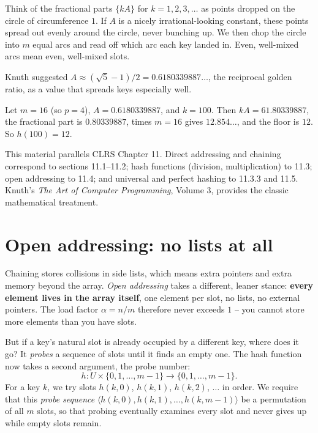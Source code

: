 \begin{intuitionbox}
Think of the fractional parts $\{kA\}$ for $k = 1, 2, 3, \dots$ as points dropped on the circle of circumference $1$. If $A$ is a nicely irrational-looking constant, these points spread out evenly around the circle, never bunching up. We then chop the circle into $m$ equal arcs and read off which arc each key landed in. Even, well-mixed arcs mean even, well-mixed slots.
\end{intuitionbox}

Knuth suggested $A \approx (\sqrt{5}-1)/2 = 0.6180339887\ldots$, the reciprocal golden ratio, as a value that spreads keys especially well.

\begin{example}
Let $m = 16$ (so $p=4$), $A = 0.6180339887$, and $k = 100$. Then $kA = 61.80339887$, the fractional part is $0.80339887$, times $m=16$ gives $12.854\ldots$, and the floor is $12$. So $h(100) = 12$.
\end{example}

\begin{marginnotebox}
This material parallels CLRS Chapter 11. Direct addressing and chaining correspond to sections 11.1--11.2; hash functions (division, multiplication) to 11.3; open addressing to 11.4; and universal and perfect hashing to 11.3.3 and 11.5. Knuth's \emph{The Art of Computer Programming}, Volume 3, provides the classic mathematical treatment.
\end{marginnotebox}

\section{Open addressing: no lists at all}

Chaining stores collisions in side lists, which means extra pointers and extra memory beyond the array. \emph{Open addressing} takes a different, leaner stance: \textbf{every element lives in the array itself}, one element per slot, no lists, no external pointers. The load factor $\alpha = n/m$ therefore never exceeds $1$ -- you cannot store more elements than you have slots.

But if a key's natural slot is already occupied by a different key, where does it go? It \emph{probes} a sequence of slots until it finds an empty one. The hash function now takes a second argument, the probe number:
\[
  h : U \times \{0,1,\dots,m-1\} \to \{0,1,\dots,m-1\}.
\]
For a key $k$, we try slots $h(k,0)$, $h(k,1)$, $h(k,2)$, $\dots$ in order. We require that this \emph{probe sequence} $\langle h(k,0), h(k,1), \dots, h(k,m-1)\rangle$ be a permutation of all $m$ slots, so that probing eventually examines every slot and never gives up while empty slots remain.

